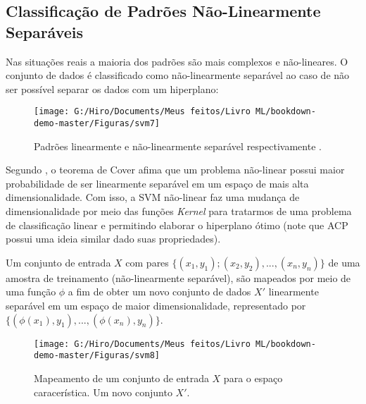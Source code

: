 \documentclass[
  openany]{book}
\begin{document}
\hypertarget{classificauxe7uxe3o-de-padruxf5es-nuxe3o-linearmente-separuxe1veis}{%
\subsection{Classificação de Padrões Não-Linearmente Separáveis}\label{classificauxe7uxe3o-de-padruxf5es-nuxe3o-linearmente-separuxe1veis}}

Nas situações reais a maioria dos padrões são mais complexos e não-lineares. O conjunto de dados é classificado como não-linearmente separável ao caso de não ser possível separar os dados com um hiperplano:

\begin{figure}

{\centering \texttt{[image: G:/Hiro/Documents/Meus feitos/Livro ML/bookdown-demo-master/Figuras/svm7]} 

}

\caption{Padrões linearmente e não-linearmente separável respectivamente \citep{gonccalves2015maquina}.}\label{fig:svm7}
\end{figure}



Segundo \citet{smola2000introduction}, o teorema de Cover afima que um problema não-linear possui maior probabilidade de ser linearmente separável em um espaço de mais alta dimensionalidade. Com isso, a SVM não-linear faz uma mudança de dimensionalidade por meio das funções \emph{Kernel} para tratarmos de uma problema de classificação linear e permitindo elaborar o hiperplano ótimo (note que ACP possui uma ideia similar dado suas propriedades).

Um conjunto de entrada \(X\) com pares \(\{(x_1,y_1);(x_2,y_2),...,(x_n,y_n)\}\) de uma amostra de treinamento (não-linearmente separável), são mapeados por meio de uma função \(\phi\) a fim de obter um novo conjunto de dados \(X'\) linearmente separável em um espaço de maior dimensionalidade, representado por \(\{(\phi(x_1),y_1),...,(\phi(x_n),y_n)\}\).

\begin{figure}

{\centering \texttt{[image: G:/Hiro/Documents/Meus feitos/Livro ML/bookdown-demo-master/Figuras/svm8]} 

}

\caption{Mapeamento de um conjunto de entrada \(X\) para o espaço caracerística. Um novo conjunto \(X'\).}\label{fig:svm8}
\end{figure}
\end{document}
